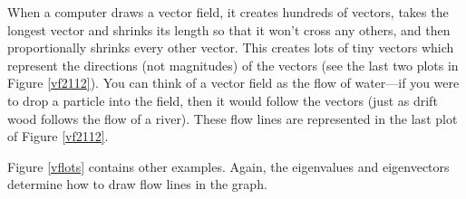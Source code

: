 \begin{example}
When a computer draws a vector field, it creates hundreds of vectors, takes the longest vector and shrinks its length so that it won't cross any others, and then proportionally shrinks every other vector. This creates lots of tiny vectors which represent the directions (not magnitudes) of the vectors (see the last two plots in Figure \ref{vf2112}). You can think of a vector field as the flow of water---if you were to drop a particle into the field, then it would follow the vectors (just as drift wood follows the flow of a river). These flow lines are represented in the last plot of Figure \ref{vf2112}.
\end{example} 

Figure \ref{vflots} contains other examples. Again, the eigenvalues and eigenvectors determine how to draw flow lines in the graph.

